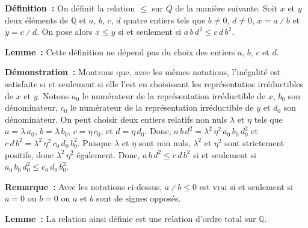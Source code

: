 \noindent\textbf{Définition :} On définit la relation $\leq$ sur $Q$ de la manière suivante. 
    Soit $x$ et $y$ deux éléments de $\mathbb{Q}$ et $a$, $b$, $c$, $d$ quatre entiers tels que $b \neq 0$, $d \neq 0$, $x = a \divslash b$ et $y = c \divslash d$.
    On pose alors $x \leq y$ si et seulement si $a \, b \, d^2 \leq c \, d \, b^2$.

\medskip

\noindent\textbf{Lemme :} Cette définition ne dépend pas du choix des entiers $a$, $b$, $c$ et $d$.

\medskip

\noindent\textbf{Démonstration :} 
    Montrons que, avec les mêmes notations, l'inégalité est satisfaite si et seulement si elle l'est en choisissant les représentatios irréductibles de $x$ et $y$.
    Notons $a_0$ le numérateur de la représentation irréductible de $x$, $b_0$ son dénominateur, $c_0$ le numérateur de la représentation irréductible de $y$ et $d_0$ son dénominateur.
    On peut choisir deux entiers relatifs non nuls $\lambda$ et $\eta$ tels que $a = \lambda \, a_0$, $b = \lambda \, b_0$, $c = \eta \, c_0$, et $d = \eta \, d_0$.
    Donc, $a \, b \, d^2 = \lambda^2 \, \eta^2 \, a_0 \, b_0 \, d_0^2$ et $c \, d \, b^2 = \lambda^2 \, \eta^2 \, c_0 \, d_0 \, b_0^2$.
    Puisque $\lambda$ et $\eta$ sont non nuls, $\lambda^2$ et $\eta^2$ sont strictement positifs, donc $\lambda^2 \, \eta^2$ également.
    Donc, $a \, b \, d^2 \leq c \, d \, b^2$ si et seulement si $a_0 \, b_0 \, d_0^2 \leq c_0 \, d_0 \, b_0^2$.
    
    \done

\medskip

\noindent\textbf{Remarque :} Avec les notations ci-dessus, $a \divslash b \leq 0$ est vrai si et seulement si $a = 0$ ou $b = 0$ ou $a$ et $b$ sont de signes opposés.

\medskip

\noindent\textbf{Lemme :} La relation ainsi définie est une relation d'ordre total sur $\mathbb{Q}$.

\medskip

